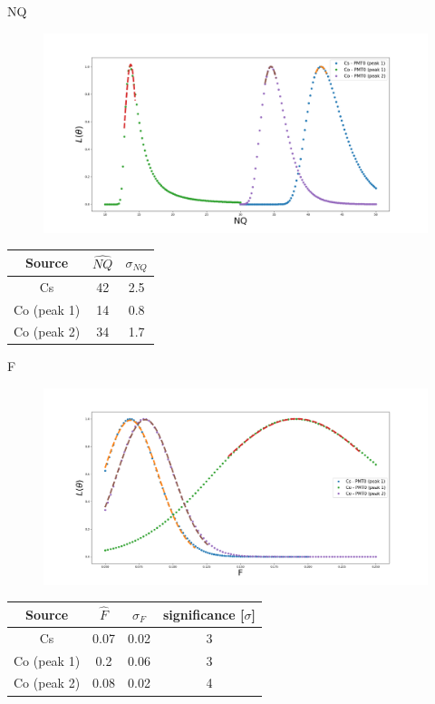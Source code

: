 \documentclass{beamer}
\begin{document}
\begin{frame}{NQ}
\begin{figure}[h]
\includegraphics[width=1\linewidth]{NQ.png}
\end{figure}

\begin{center}
\begin{tabular}{ |c| c| c|}
\hline
 Source & $\hat{NQ}$ & $\sigma_{NQ}$\\ 
\hline
Cs & 42 & 2.5\\  
\hline  
Co (peak 1) & 14 & 0.8\\  
\hline  
Co (peak 2) & 34 & 1.7\\ 
\hline
\end{tabular}
\end{center}
\end{frame}


\begin{frame}{F}
\begin{figure}[h]
\includegraphics[width=1\linewidth]{F.png}
\end{figure}

\begin{center}
\begin{tabular}{ |c| c| c|c|}
\hline
 Source & $\hat{F}$ & $\sigma_{F}$ & significance [$\sigma$]\\ 
\hline
Cs & 0.07 & 0.02 & 3\\  
\hline  
Co (peak 1) & 0.2 & 0.06 & 3\\  
\hline  
Co (peak 2) & 0.08 & 0.02 & 4\\ 
\hline
\end{tabular}
\end{center}
\end{frame}
\end{document}

